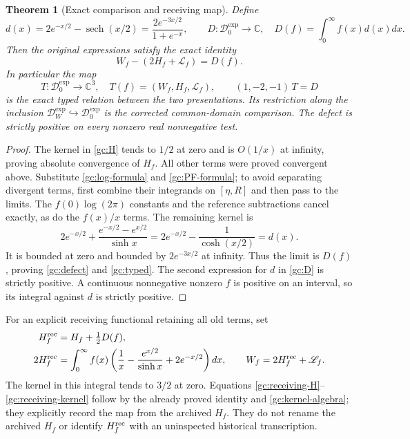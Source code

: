 \documentclass[11pt]{article}
\newtheorem{theorem}{Theorem}
\newcommand{\C}{\mathbb C}
\newcommand{\sech}{\operatorname{sech}}
\begin{document}
\begin{theorem}[Exact comparison and receiving map]
Define
\begin{equation}
 d(x)=2e^{-x/2}-\sech(x/2)
     =\frac{2e^{-3x/2}}{1+e^{-x}},\qquad
 D:\mathcal D_0^{\exp}\to\C,\quad D(f)=\int_0^\infty f(x)d(x)dx.
 \label{gc:D}
\end{equation}
Then the original expressions satisfy the exact identity
\begin{equation}
 \boxed{W_f-(2H_f+\mathscr L_f)=D(f).}
 \label{gc:defect}
\end{equation}
In particular the map
\begin{equation}
 T:\mathcal D_0^{\exp}\to\C^3,\quad T(f)=(W_f,H_f,\mathscr L_f),
 \qquad (1,-2,-1)\,T=D
 \label{gc:typed}
\end{equation}
is the exact typed relation between the two presentations.  Its restriction
along the inclusion $\mathcal D_W^{\exp}\hookrightarrow\mathcal D_0^{\exp}$
is the corrected common-domain comparison.
The defect is strictly positive on every nonzero real nonnegative test.
\end{theorem}
\begin{proof}
The kernel in \eqref{gc:H} tends to $1/2$ at zero and is $O(1/x)$ at
infinity, proving absolute convergence of $H_f$.  All other terms were
proved convergent above.  Substitute \eqref{gc:log-formula} and
\eqref{gc:PF-formula}; to avoid separating divergent terms, first combine
their integrands on $[\eta,R]$ and then pass to the limits.  The
$f(0)\log(2\pi)$ constants and the reference subtractions cancel exactly,
as do the $f(x)/x$ terms.  The remaining kernel is
\begin{equation}
 2e^{-x/2}+\frac{e^{-x/2}-e^{x/2}}{\sinh x}
 =2e^{-x/2}-\frac1{\cosh(x/2)}=d(x).
 \label{gc:kernel-algebra}
\end{equation}
It is bounded at zero and bounded by $2e^{-3x/2}$ at infinity.
Thus the limit is $D(f)$, proving \eqref{gc:defect} and \eqref{gc:typed}.
The second expression for $d$ in \eqref{gc:D} is strictly positive.
A continuous nonnegative nonzero $f$ is positive on an interval, so its
integral against $d$ is strictly positive.
\end{proof}

For an explicit receiving functional retaining all old terms, set
\begin{align}
 H_f^{\rm rec}&=H_f+\tfrac12D(f),\label{gc:receiving-H}\\
 2H_f^{\rm rec}
 &=\int_0^\infty f(x)
  \left(\frac1x-\frac{e^{x/2}}{\sinh x}+2e^{-x/2}\right)dx,
 \qquad W_f=2H_f^{\rm rec}+\mathscr L_f.
 \label{gc:receiving-kernel}
\end{align}
The kernel in this integral tends to $3/2$ at zero.  Equations
\eqref{gc:receiving-H}--\eqref{gc:receiving-kernel} follow by the already
proved identity and \eqref{gc:kernel-algebra}; they explicitly record the
map from the archived $H_f$.  They do not rename the archived $H_f$ or
identify $H_f^{\rm rec}$ with an uninspected historical transcription.
\end{document}
